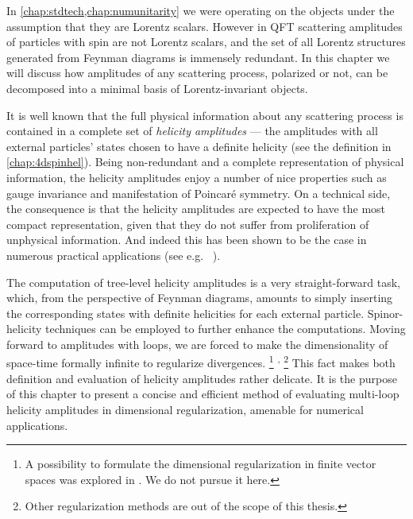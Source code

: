 \newcommand\helampl{\mathcal{A}_{\vb*{\lambda}}}

In \cref{chap:stdtech,chap:numunitarity} we were operating on the objects under the assumption that they are Lorentz scalars.
However in QFT scattering amplitudes of particles with spin are not Lorentz scalars,
and the set of all Lorentz structures generated from Feynman diagrams is immensely redundant.
In this chapter we will discuss how amplitudes of any scattering process, 
polarized or not, can be decomposed into a minimal basis of Lorentz-invariant objects.

It is well known that the full physical information about any scattering process is contained in a complete set of \textit{helicity amplitudes} ---
the amplitudes with all external particles' states chosen to have a definite helicity (see the definition in \cref{chap:4dspinhel}).
Being non-redundant and a complete representation of physical information, the helicity amplitudes 
enjoy a number of nice properties such as gauge invariance and manifestation of Poincaré symmetry.
On a technical side, the consequence is that the helicity amplitudes are expected to have the most compact representation,
given that they do not suffer from proliferation of unphysical information.
And indeed this has been shown to be the case in numerous practical applications (see e.g.\ %
\cite{DeLaurentis:2019phz,Badger:2019djh,Badger:2011yu,Badger:2013gxa,DeFreitas:2004kmi,Gehrmann:2011aa,Gehrmann:2009vu,Glover:2004si,Glover:2003cm,Garland:2002ak,Dunbar:2016aux,Dunbar:2016gjb,Dunbar:2016cxp,Badger:2015lda,Gehrmann:2015bfy,Bern:2003ck,Bern:2002tk,Badger:2018enw,Dunbar2017,Kunszt:1994nq}).

The computation of tree-level helicity amplitudes is a very straight-forward task,
which, from the perspective of Feynman diagrams,
amounts to simply inserting the corresponding states with definite helicities for each external particle.
Spinor-helicity techniques can be employed to further enhance the computations.
Moving forward to amplitudes with loops,
we are forced to make the dimensionality of space-time formally infinite \cite{Collins:1984xc} 
to regularize divergences.%
\footnote{
  A possibility to formulate the dimensional regularization in finite vector spaces was explored in \cite{Weinzierl:1999xb}.
  We do not pursue it here.
}%
\textsuperscript{,}%
\footnote{
  Other regularization methods are out of the scope of this thesis.
}
This fact makes both definition and evaluation of helicity amplitudes rather delicate.
It is the purpose of this chapter to present a concise and efficient method of
evaluating multi-loop helicity amplitudes in dimensional regularization,
amenable for numerical applications.

